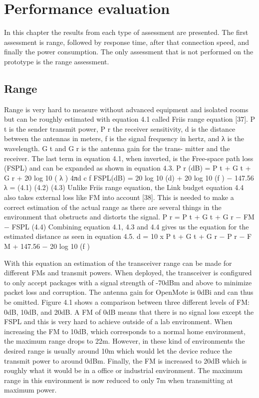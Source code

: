 \section{Performance evaluation}

In this chapter the results from each type of assessment are presented.
The first assessment is range,
	followed by response time,
	after that connection speed,
	and finally the power consumption.
The only assessment that is not performed on the prototype is the range assessment.

\subsection{Range}
Range is very hard to measure without advanced equipment and isolated
rooms but can be roughly estimated with equation 4.1 called Friis range
equation [37]. P t is the sender transmit power, P r the receiver sensitivity, d
is the distance between the antennas in meters, f is the signal frequency in
hertz, and λ is the wavelength. G t and G r is the antenna gain for the trans-
mitter and the receiver. The last term in equation 4.1, when inverted, is the
Free-space path loss (FSPL) and can be expanded as shown in equation 4.3.
P r (dB) = P t + G t + G r + 20 log 10 (
λ
)
4πd
c
f
FSPL(dB) = 20 log 10 (d) + 20 log 10 (f ) − 147.56
λ =
(4.1)
(4.2)
(4.3)
Unlike Friis range equation, the Link budget equation 4.4 also takes external
loss like FM into account [38]. This is needed to make a correct estimation of
the actual range as there are several things in the environment that obstructs
and distorts the signal.
P r = P t + G t + G r − FM − FSPL
(4.4)
Combining equation 4.1, 4.3 and 4.4 gives us the equation for the estimated
distance as seen in equation 4.5.
d = 10 x
P t + G t + G r − P r − F M + 147.56 − 20 log 10 (f )


With this equation an estimation of the transceiver range can be made for different FMs and transmit powers.
When deployed,
	the transceiver is configured to only accept packages with a signal strength of -70dBm and above to minimize packet loss and corruption.
The antenna gain for OpenMote is 0dBi and can thus be omitted.
Figure 4.1 shows a comparison between three different levels of FM: 0dB, 10dB,
	and 20dB.
A FM of 0dB means that there is no signal loss except the FSPL and this is very hard to achieve outside of a lab environment.
When increasing the FM to 10dB,
	which corresponds to a normal home environment,
	the maximum range drops to 22m.
However,
	in these kind of environments the desired range is usually around 10m which would let the device reduce the transmit power to around 0dBm.
Finally,
	the FM is increased to 20dB which is roughly what it would be in a office or industrial environment.
The maximum range in this environment is now reduced to only 7m when transmitting at maximum power.

